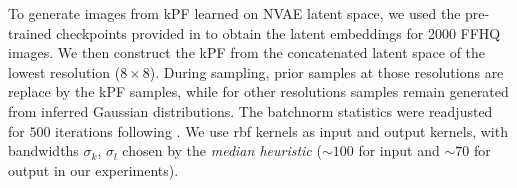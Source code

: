 To generate images from kPF learned on NVAE latent space, we used the pre-trained checkpoints provided in \citep{vahdat2020NVAE} to obtain the latent embeddings for 2000 FFHQ images. We then construct the kPF from the concatenated latent space of the lowest resolution ($8 \times 8$). During sampling, prior samples at those resolutions are replace by the kPF samples, while for other resolutions samples remain generated from inferred Gaussian distributions. The batchnorm statistics were readjusted for $500$ iterations following \citep{vahdat2020NVAE}. We use rbf kernels as input and output kernels, with bandwidths $\sigma_k$, $\sigma_l$ chosen by the \textit{median heuristic} ($\sim100$ for input and $\sim70$ for output in our experiments).

\newcommand{\conv}[2]{\textrm{Conv}_{#1}^{#2}}
\newcommand{\convt}[2]{\textrm{ConvT}_{#1}^{#2}}
\newcommand{\resblock}[2]{\textrm{ResBlock}_{#1} \times #2}
\renewcommand{\arraystretch}{1.2}
